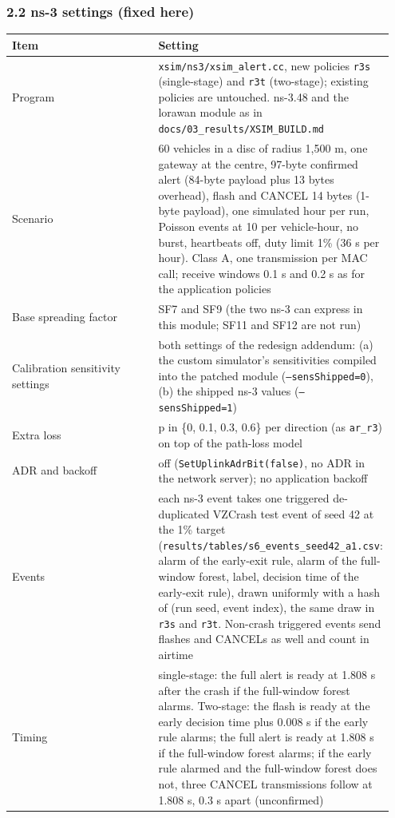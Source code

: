 \subsubsection*{2.2 ns-3 settings (fixed here)}

{\scriptsize\raggedright
\begin{longtable}{p{0.475\linewidth}p{0.475\linewidth}}
\toprule
Item & Setting \\
\midrule
\endhead
Program & \texttt{xsim/ns3/xsim\_alert.cc}, new policies \texttt{r3s} (single-stage) and \texttt{r3t} (two-stage); existing policies are untouched. ns-3.48 and the lorawan module as in \texttt{docs/03\_results/XSIM\_BUILD.md} \\
Scenario & 60 vehicles in a disc of radius 1,500 m, one gateway at the centre, 97-byte confirmed alert (84-byte payload plus 13 bytes overhead), flash and CANCEL 14 bytes (1-byte payload), one simulated hour per run, Poisson events at 10 per vehicle-hour, no burst, heartbeats off, duty limit 1\% (36 s per hour). Class A, one transmission per MAC call; receive windows 0.1 s and 0.2 s as for the application policies \\
Base spreading factor & SF7 and SF9 (the two ns-3 can express in this module; SF11 and SF12 are not run) \\
Calibration sensitivity settings & both settings of the redesign addendum: (a) the custom simulator's sensitivities compiled into the patched module (\texttt{--sensShipped=0}), (b) the shipped ns-3 values (\texttt{--sensShipped=1}) \\
Extra loss & p in \{0, 0.1, 0.3, 0.6\} per direction (as \texttt{ar\_r3}) on top of the path-loss model \\
ADR and backoff & off (\texttt{SetUplinkAdrBit(false)}, no ADR in the network server); no application backoff \\
Events & each ns-3 event takes one triggered de-duplicated VZCrash test event of seed 42 at the 1\% target (\texttt{results/tables/s6\_events\_seed42\_a1.csv}: alarm of the early-exit rule, alarm of the full-window forest, label, decision time of the early-exit rule), drawn uniformly with a hash of (run seed, event index), the same draw in \texttt{r3s} and \texttt{r3t}. Non-crash triggered events send flashes and CANCELs as well and count in airtime \\
Timing & single-stage: the full alert is ready at 1.808 s after the crash if the full-window forest alarms. Two-stage: the flash is ready at the early decision time plus 0.008 s if the early rule alarms; the full alert is ready at 1.808 s if the full-window forest alarms; if the early rule alarmed and the full-window forest does not, three CANCEL transmissions follow at 1.808 s, 0.3 s apart (unconfirmed) \\

\end{longtable}}
